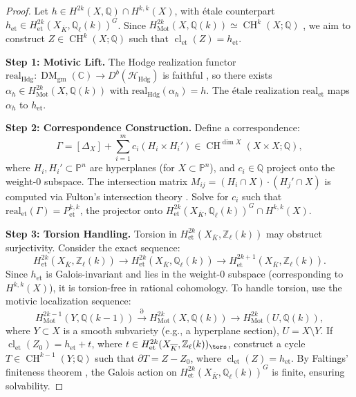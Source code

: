 \documentclass[11pt]{article}
\DeclareMathOperator{\cl}{cl}
\DeclareMathOperator{\CH}{CH}
\DeclareMathOperator{\Mot}{Mot}
\DeclareMathOperator{\DM}{DM}
\begin{document}
\begin{proof}
Let \(h \in H^{2k}(X, \mathbb{Q}) \cap H^{k,k}(X)\), with étale counterpart \(h_{\mathrm{et}} \in H^{2k}_{\mathrm{et}}(X_{\overline{K}}, \mathbb{Q}_\ell(k))^G\). Since \(H^{2k}_{\Mot}(X, \mathbb{Q}(k)) \simeq \CH^k(X; \mathbb{Q})\) \cite{voevodsky2000}, we aim to construct \(Z \in \CH^k(X; \mathbb{Q})\) such that \(\cl_{\mathrm{et}}(Z) = h_{\mathrm{et}}\).

\textbf{Step 1: Motivic Lift.}
The Hodge realization functor \(\mathrm{real}_{\mathrm{Hdg}}: \DM_{\mathrm{gm}}(\mathbb{C}) \to D^b(\mathcal{H}_{\mathrm{Hdg}})\) is faithful \cite{cisinski2019triangulated}, so there exists \(\alpha_h \in H^{2k}_{\Mot}(X, \mathbb{Q}(k))\) with \(\mathrm{real}_{\mathrm{Hdg}}(\alpha_h) = h\). The étale realization \(\mathrm{real}_{\mathrm{et}}\) maps \(\alpha_h\) to \(h_{\mathrm{et}}\).

\textbf{Step 2: Correspondence Construction.}
Define a correspondence:
\[
\Gamma = [\Delta_X] + \sum_{i=1}^m c_i (H_i \times H_i') \in \CH^{\dim X}(X \times X; \mathbb{Q}),
\]
where \(H_i, H_i' \subset \mathbb{P}^n\) are hyperplanes (for \(X \subset \mathbb{P}^n\)), and \(c_i \in \mathbb{Q}\) project onto the weight-0 subspace. The intersection matrix \(M_{ij} = (H_i \cap X) \cdot (H_j' \cap X)\) is computed via Fulton’s intersection theory \cite{fulton1984}. Solve for \(c_i\) such that \(\mathrm{real}_{\mathrm{et}}(\Gamma) = P^{k,k}_{\mathrm{et}}\), the projector onto \(H^{2k}_{\mathrm{et}}(X_{\overline{K}}, \mathbb{Q}_\ell(k))^G \cap H^{k,k}(X)\).

\textbf{Step 3: Torsion Handling.}
Torsion in \(H^{2k}_{\mathrm{et}}(X_{\overline{K}}, \mathbb{Z}_\ell(k))\) may obstruct surjectivity. Consider the exact sequence:
\[
H^{2k}_{\mathrm{et}}(X_{\overline{K}}, \mathbb{Z}_\ell(k)) \to H^{2k}_{\mathrm{et}}(X_{\overline{K}}, \mathbb{Q}_\ell(k)) \to H^{2k+1}_{\mathrm{et}}(X_{\overline{K}}, \mathbb{Z}_\ell(k)).
\]
Since \(h_{\mathrm{et}}\) is Galois-invariant and lies in the weight-0 subspace (corresponding to \(H^{k,k}(X)\)), it is torsion-free in rational cohomology. To handle torsion, use the motivic localization sequence:
\[
H^{2k-1}_{\Mot}(Y, \mathbb{Q}(k-1)) \xrightarrow{\partial} H^{2k}_{\Mot}(X, \mathbb{Q}(k)) \to H^{2k}_{\Mot}(U, \mathbb{Q}(k)),
\]
where \(Y \subset X\) is a smooth subvariety (e.g., a hyperplane section), \(U = X \setminus Y\). If \(\cl_{\mathrm{et}}(Z_0) = h_{\mathrm{et}} + t\), where \(t \in H^{2k}_{\mathrm{et}}(X_{\overline{K}}, \mathbb{Z}_\ell(k))_{\tors}\), construct a cycle \(T \in \CH^{k-1}(Y; \mathbb{Q})\) such that \(\partial T = Z - Z_0\), where \(\cl_{\mathrm{et}}(Z) = h_{\mathrm{et}}\). By Faltings’ finiteness theorem \cite{faltings1983}, the Galois action on \(H^{2k}_{\mathrm{et}}(X_{\overline{K}}, \mathbb{Q}_\ell(k))^G\) is finite, ensuring solvability.


\end{proof}
\end{document}
